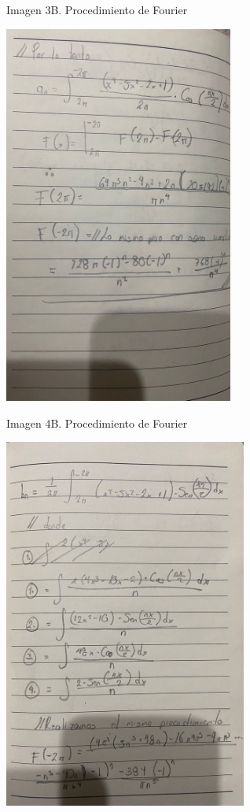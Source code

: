 Imagen 3B. Procedimiento de Fourier

\includegraphics[width=2.97297in,height=4.92052in]{media/image2.jpg}

Imagen 4B. Procedimiento de Fourier

\includegraphics[width=3.1436in,height=4.80787in]{media/image9.jpg}

